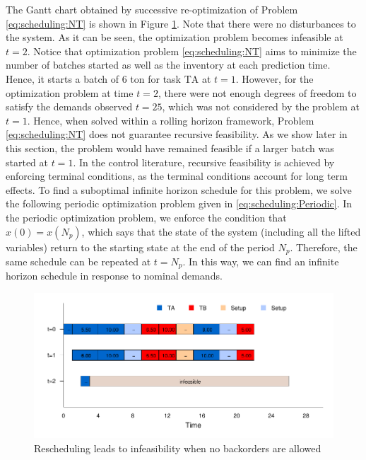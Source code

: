 The Gantt chart obtained by successive re-optimization of Problem
\eqref{eq:scheduling:NT} is shown in 
Figure \ref{fig:scheduling:gantt_NT}. Note that there were no
disturbances to the system. As it can be seen, the optimization problem
becomes infeasible at $t=2$. Notice that optimization problem
\eqref{eq:scheduling:NT} aims to minimize the number of batches
started as well as the inventory at each prediction time. Hence, it
starts a batch of 6 ton for task $\text{TA}$ at $t=1$. However, for
the optimization problem at time $t=2$, there were not enough degrees
of freedom to satisfy the demands observed $t=25$, which was not considered
by the problem at $t=1$. Hence, when solved within a rolling horizon
framework, Problem \eqref{eq:scheduling:NT} does not guarantee
recursive feasibility. As we show later in this section, the problem
would have remained feasible if a larger batch was started at $t=1$.
In the control literature, recursive feasibility is achieved by enforcing terminal
conditions, as the terminal conditions account for long term
effects. To find a suboptimal infinite horizon schedule for this
problem, we solve the following periodic optimization problem given in
\eqref{eq:scheduling:Periodic}. In the periodic optimization problem,
we enforce the condition that $x(0) = x(N_p)$, which says that the state
of the system (including all the lifted variables) return to the
starting state at the end of the period $N_p$. Therefore, the same schedule
can be repeated at $t=N_p$. In this way, we can find an infinite
horizon schedule in response to nominal demands. 

\begin{figure}
\begin{center}
\includegraphics{scheduling/gantt_NT.pdf}
\caption{Rescheduling leads to infeasibility when no backorders are allowed}
\label{fig:scheduling:gantt_NT}
\end{center}
\end{figure}

